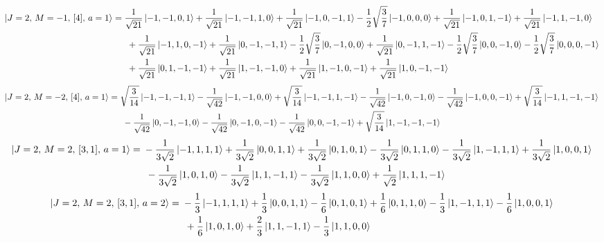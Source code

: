 \documentclass{article}
\begin{document}
{\small
\begin{equation*}
\begin{aligned}
\ket{J=2,\,M=-1,\,[4],\,a=1} = \; &\frac{1}{\sqrt{21}} \ket{-1,-1,0,1} + \frac{1}{\sqrt{21}} \ket{-1,-1,1,0} + \frac{1}{\sqrt{21}} \ket{-1,0,-1,1} - \frac{1}{2}\sqrt{\frac{3}{7}} \ket{-1,0,0,0} + \frac{1}{\sqrt{21}} \ket{-1,0,1,-1} + \frac{1}{\sqrt{21}} \ket{-1,1,-1,0} \\
  & \; + \frac{1}{\sqrt{21}} \ket{-1,1,0,-1} + \frac{1}{\sqrt{21}} \ket{0,-1,-1,1} - \frac{1}{2}\sqrt{\frac{3}{7}} \ket{0,-1,0,0} + \frac{1}{\sqrt{21}} \ket{0,-1,1,-1} - \frac{1}{2}\sqrt{\frac{3}{7}} \ket{0,0,-1,0} - \frac{1}{2}\sqrt{\frac{3}{7}} \ket{0,0,0,-1} \\
  & \; + \frac{1}{\sqrt{21}} \ket{0,1,-1,-1} + \frac{1}{\sqrt{21}} \ket{1,-1,-1,0} + \frac{1}{\sqrt{21}} \ket{1,-1,0,-1} + \frac{1}{\sqrt{21}} \ket{1,0,-1,-1}
\end{aligned}
\end{equation*}}
{\small
\begin{equation*}
\begin{aligned}
\ket{J=2,\,M=-2,\,[4],\,a=1} = \; &\sqrt{\frac{3}{14}} \ket{-1,-1,-1,1} - \frac{1}{\sqrt{42}} \ket{-1,-1,0,0} + \sqrt{\frac{3}{14}} \ket{-1,-1,1,-1} - \frac{1}{\sqrt{42}} \ket{-1,0,-1,0} - \frac{1}{\sqrt{42}} \ket{-1,0,0,-1} + \sqrt{\frac{3}{14}} \ket{-1,1,-1,-1} \\
  & \; - \frac{1}{\sqrt{42}} \ket{0,-1,-1,0} - \frac{1}{\sqrt{42}} \ket{0,-1,0,-1} - \frac{1}{\sqrt{42}} \ket{0,0,-1,-1} + \sqrt{\frac{3}{14}} \ket{1,-1,-1,-1}
\end{aligned}
\end{equation*}}
{\small
\begin{equation*}
\begin{aligned}
\ket{J=2,\,M=2,\,[3,1],\,a=1} = \; &- \frac{1}{3\sqrt{2}} \ket{-1,1,1,1} + \frac{1}{3\sqrt{2}} \ket{0,0,1,1} + \frac{1}{3\sqrt{2}} \ket{0,1,0,1} - \frac{1}{3\sqrt{2}} \ket{0,1,1,0} - \frac{1}{3\sqrt{2}} \ket{1,-1,1,1} + \frac{1}{3\sqrt{2}} \ket{1,0,0,1} \\
  & \; - \frac{1}{3\sqrt{2}} \ket{1,0,1,0} - \frac{1}{3\sqrt{2}} \ket{1,1,-1,1} - \frac{1}{3\sqrt{2}} \ket{1,1,0,0} + \frac{1}{\sqrt{2}} \ket{1,1,1,-1}
\end{aligned}
\end{equation*}}
{\small
\begin{equation*}
\begin{aligned}
\ket{J=2,\,M=2,\,[3,1],\,a=2} = \; &- \frac{1}{3} \ket{-1,1,1,1} + \frac{1}{3} \ket{0,0,1,1} - \frac{1}{6} \ket{0,1,0,1} + \frac{1}{6} \ket{0,1,1,0} - \frac{1}{3} \ket{1,-1,1,1} - \frac{1}{6} \ket{1,0,0,1} \\
  & \; + \frac{1}{6} \ket{1,0,1,0} + \frac{2}{3} \ket{1,1,-1,1} - \frac{1}{3} \ket{1,1,0,0}
\end{aligned}
\end{equation*}}
\end{document}
